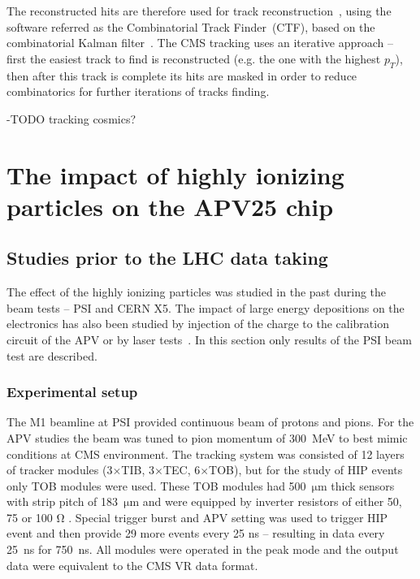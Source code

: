 The reconstructed hits are therefore used for track reconstruction~\cite{Chatrchyan:2014fea}, using the software referred as the Combinatorial Track Finder~(CTF), based on the combinatorial Kalman filter~\cite{Fruhwirth:1987fm}. The CMS tracking uses an iterative approach -- first the easiest track to find is reconstructed (e.g. the one with the highest $p_{T}$), then after this track is complete its hits are masked in order to reduce combinatorics for further iterations of tracks finding.



-TODO tracking cosmics?

\section{The impact of highly ionizing particles on the APV25 chip}



\subsection{Studies prior to the LHC data taking~\label{sec:HIPinPast}}

The effect of the highly ionizing particles was studied in the past during the beam tests -- PSI and CERN X5. The impact of large energy depositions on the electronics has also been studied by injection of the charge to the calibration circuit of the APV or by laser tests~\cite{Adam:2005pz}. In this section only results of the PSI beam test are described.

\subsubsection{Experimental setup}

The M1 beamline at PSI provided continuous beam of protons and pions. For the APV studies the beam was tuned to pion momentum of 300~MeV to best mimic conditions at CMS environment. The tracking system was consisted of 12 layers of tracker modules (3$\times$TIB, 3$\times$TEC, 6$\times$TOB), but for the study of HIP events only TOB modules were used. These TOB modules had 500~$\mathrm{\mu m}$ thick sensors with strip pitch of 183~$\mathrm{\mu}$m and were equipped by inverter resistors of either 50, 75 or 100 $\mathrm{\Omega}$ . Special trigger burst and APV setting was used to trigger HIP event and then provide 29 more events every 25 ns -- resulting in data every 25~ns for 750~ns. All modules were operated in the peak mode and the output data were equivalent to the CMS VR data format. 


